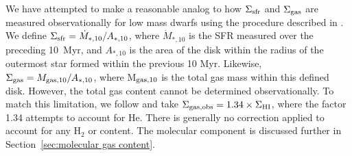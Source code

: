 \documentclass[twocolumn]{aastex61}
\begin{document}
We have attempted to make a reasonable analog to how $\Sigma_{\rm sfr}$ and $\Sigma_{\rm gas}$ are measured observationally for low mass dwarfs using the procedure described in \citet{Roychowdhury2014}. We define $\Sigma_{\rm sfr} = \dot{M}_{*,10} / A_{*,10}$, where $\dot{M}_{*,10}$ is the SFR measured over the preceding 10~Myr, and $A_{*,10}$ is the
   area of the disk within the radius of the outermost 
star formed within the previous 10 Myr. Likewise, $\Sigma_{\rm gas} = M_{\rm gas,10} / A_{*,10}$, where M$_{\rm gas,10}$ is the total gas mass within this defined disk. However, the total gas content cannot be determined observationally. To match this limitation, we follow \cite{Roychowdhury2014} and take $\Sigma_{\rm gas, obs} = 1.34 \times \Sigma_{\rm HI}$, where the factor 1.34 attempts to account for He. There is generally no correction applied to account for any H$_{2}$ or  content. The molecular component is discussed further in Section~\ref{sec:molecular gas content}.
\end{document}
